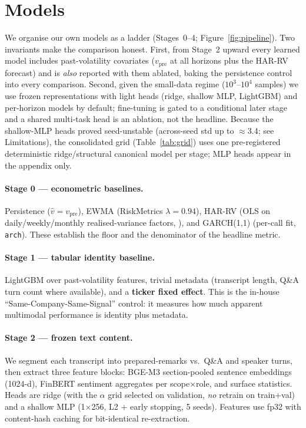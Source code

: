 \section{Models}
\label{sec:methods}

We organise our own models as a ladder (Stages~0--4; Figure~\ref{fig:pipeline}).
Two invariants make the comparison honest. First, from Stage~2 upward every learned
model includes past-volatility covariates ($v_{\mathrm{pre}}$ at all horizons plus
the HAR-RV forecast) and is \emph{also} reported with them ablated, baking the
persistence control into every comparison. Second, given the small-data regime
($10^3$--$10^4$ samples) we use frozen representations with light heads (ridge,
shallow MLP, LightGBM) and per-horizon models by default; fine-tuning is gated to
a conditional later stage and a shared multi-task head is an ablation, not the
headline. Because the shallow-MLP heads proved seed-unstable (across-seed \Rtwo{}
std up to $\approx$3.4; see Limitations), the consolidated grid
(Table~\ref{tab:grid}) uses one pre-registered deterministic ridge/structural
canonical model per stage; MLP heads appear in the appendix only.



\paragraph{Stage 0 --- econometric baselines.}
Persistence ($\hat v = v_{\mathrm{pre}}$), EWMA (RiskMetrics $\lambda{=}0.94$),
HAR-RV (OLS on daily/weekly/monthly realised-variance factors,
\citealp{corsi2009har}), and GARCH(1,1) (per-call fit, \texttt{arch}). These
establish the floor and the denominator of the headline metric.

\paragraph{Stage 1 --- tabular identity baseline.}
LightGBM over past-volatility features, trivial metadata (transcript length, Q\&A
turn count where available), and a \textbf{ticker fixed effect}. This is the
in-house ``Same-Company-Same-Signal'' control: it measures how much apparent
multimodal performance is identity plus metadata.

\paragraph{Stage 2 --- frozen text content.}
We segment each transcript into prepared-remarks vs.\ Q\&A and speaker turns, then
extract three feature blocks: BGE-M3 \citep{bge2024} section-pooled sentence
embeddings (1024-d), FinBERT \citep{finbert} sentiment aggregates per
scope$\times$role, and surface statistics. Heads are ridge (with the $\alpha$ grid
selected on validation, \emph{no} retrain on train$+$val) and a shallow MLP
(1$\times$256, L2 $+$ early stopping, 5 seeds). Features use fp32 with content-hash
caching for bit-identical re-extraction.

